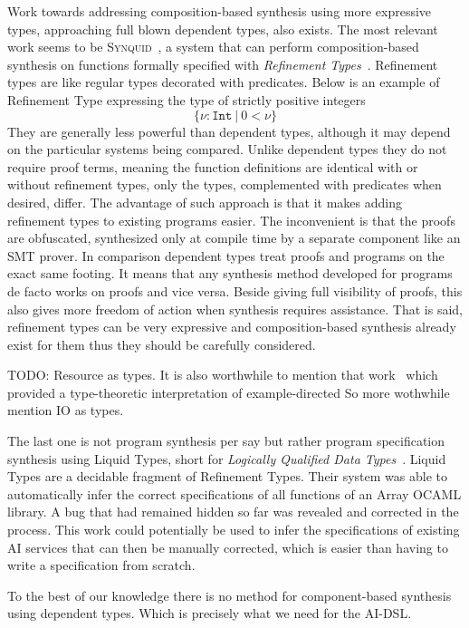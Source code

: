 \documentclass[]{report}
\begin{document}
Work towards addressing composition-based synthesis using more
expressive types, approaching full blown dependent types, also exists.
The most relevant work seems to be
\textsc{Synquid}~\cite{Polikarpova2016}, a system that can perform
composition-based synthesis on functions formally specified with
\emph{Refinement Types}~\cite{Flanagan2006}.  Refinement types are
like regular types decorated with predicates.  Below is an example of
Refinement Type expressing the type of strictly positive integers
$$\{\nu : \texttt{Int}\ |\ 0 < \nu\}$$
They are generally less powerful than dependent types, although it may
depend on the particular systems being compared.  Unlike dependent
types they do not require proof terms, meaning the function
definitions are identical with or without refinement types, only the
types, complemented with predicates when desired, differ.  The
advantage of such approach is that it makes adding refinement types to
existing programs easier.  The inconvenient is that the proofs are
obfuscated, synthesized only at compile time by a separate component
like an SMT prover.  In comparison dependent types treat proofs and
programs on the exact same footing.  It means that any synthesis
method developed for programs de facto works on proofs and vice versa.
Beside giving full visibility of proofs, this also gives more freedom
of action when synthesis requires assistance.  That is said,
refinement types can be very expressive and composition-based
synthesis already exist for them thus they should be carefully
considered.

TODO: Resource as types.
It is also worthwhile to mention that work~\cite{} which provided a
type-theoretic interpretation of example-directed So more wothwhile mention
IO as types.

The last one is not program synthesis per say but rather program
specification synthesis using Liquid Types, short for \emph{Logically
  Qualified Data Types}~\cite{Rondon2008}.  Liquid Types are a
decidable fragment of Refinement Types.  Their system was able to
automatically infer the correct specifications of all functions of an
Array OCAML library.  A bug that had remained hidden so far was
revealed and corrected in the process.  This work could potentially be
used to infer the specifications of existing AI services that can then
be manually corrected, which is easier than having to write a
specification from scratch.

To the best of our knowledge there is no method for component-based
synthesis using dependent types.  Which is precisely what we need for
the AI-DSL.
\end{document}
